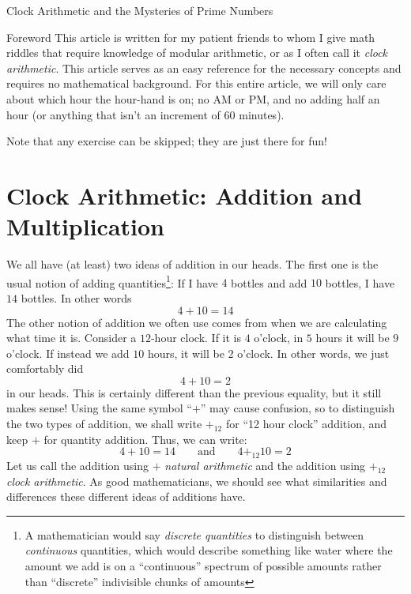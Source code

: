 \documentclass[oneside]{book}
\author{Nathanael Chwojko-Srawley}
\newcommand{\qn}{\quad\newline}
\begin{document}
\begin{center}
  \Huge{Clock Arithmetic and the Mysteries of Prime Numbers}
\end{center}

\begin{titledBox*}{Foreword}
  \qn
  This article is written for my patient friends to whom I give math riddles that require knowledge of modular
  arithmetic, or as I often call it \emph{clock arithmetic}. This article serves as an easy reference for the
  necessary concepts and requires no mathematical background. For this entire article, we will only care about
  which hour the hour-hand is on; no AM or PM, and no adding half an hour (or anything that isn't an increment
  of 60 minutes).

  \qn
  Note that any exercise can be skipped; they are just there for fun!
\end{titledBox*}

\section{Clock Arithmetic: Addition and Multiplication}


We all have (at least) two ideas of addition in our heads. The first one is the usual notion of adding
quantities\footnote{A mathematician would say \emph{discrete quantities} to distinguish between
  \emph{continuous} quantities, which would describe something like water where the amount we add is on a
``continuous'' spectrum of possible amounts rather than ``discrete'' indivisible chunks of amounts}: If I have
$4$ bottles and add $10$ bottles, I have $14$ bottles. In other words
\[
  4+10 = 14
\]
The other notion of addition we often use comes from when we are calculating what time it is. Consider a
$12$-hour clock. If it is $4$ o'clock, in $5$ hours it will be $9$ o'clock. If instead we add $10$ hours, it
will be $2$ o'clock. In other words, we just comfortably did
\[
  4+10 = 2
\]
in our heads. This is certainly different than the previous equality, but it still makes sense! Using the same symbol ``$+$''
may cause confusion, so to distinguish the two types of addition, we shall write $+_{12}$ for ``12 hour
clock'' addition, and keep $+$ for quantity addition. Thus, we can write:
\[
  4+10 = 14 \qquad \text{and} \qquad 4+_{12}10 = 2
\]
Let us call the addition using $+$ \emph{natural arithmetic} and the addition using $+_{12}$
\emph{clock arithmetic}. As good mathematicians, we should see what similarities and differences these
different ideas of additions have.
\end{document}
